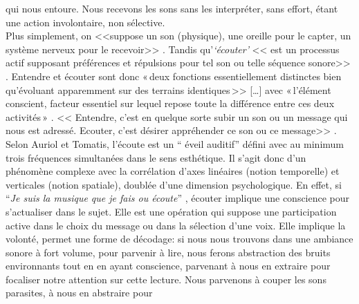 qui nous entoure. Nous recevons les sons sans les interpréter, sans
effort, étant une action involontaire, non
sélective. 
\\
Plus simplement, on
	<<suppose un son (physique), une oreille
	pour le capter, un système nerveux pour le recevoir>> \autocite[2]{auriol:cle}.
 Tandis qu'\textit{`écouter'}
	<< est un
	processus actif supposant préférences et répulsions pour tel son ou
	telle séquence sonore>> \autocite[2]{auriol:cle}.
Entendre et écouter sont donc  «\,deux
fonctions essentiellement distinctes bien qu'évoluant apparemment sur
des terrains iden\-ti\-ques\,>>
[\dots] avec «\,l'é\-lé\-ment cons\-cient, facteur essentiel sur lequel repose toute la
différence entre ces deux activités\,» \autocite[122]{tomatis_oreille_1987}.
	<<	Entendre, c'est en quelque sorte subir
		un son
 ou un message qui nous est adressé. Ecouter, c'est désirer appréhender ce son ou ce message>> 
	\autocite [p. 111]{tomatis:education}.
\\
Selon Auriol %
 et Tomatis, l'écoute est un `` éveil auditif''  défini avec au
minimum trois
fréquences simultanées dans le sens esthétique. %
Il s'agit donc d'un phénomène
complexe avec la corrélation d'axes
linéaires (notion temporelle) et verticales (notion spatiale), doublée d'une
dimension psychologique.
En effet, si \enquote{\emph{Je suis la musique que je fais ou écoute}}
\autocite [8]{viret:b}, écouter implique une conscience pour s'actualiser dans le sujet.
Elle est une opération
qui suppose une participation active dans le choix du message
ou dans la sélection d'une voix. Elle  implique la volonté,
permet une forme de décodage:
si nous nous trouvons dans une ambiance sonore à fort volume, pour
parvenir à lire, nous
ferons abstraction des bruits environnants tout en en ayant
conscience, parvenant à nous en extraire pour focaliser notre
attention sur cette lecture. Nous parvenons à couper les sons parasites, à nous en abstraire pour
